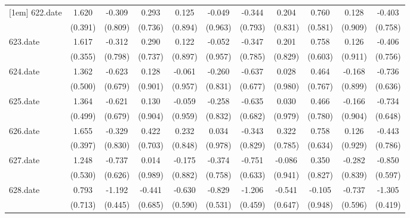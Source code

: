 \begin{tabular}{l*{10}{c}}
[1em]
622.date    &       1.620&      -0.309&       0.293&       0.125&      -0.049&      -0.344&       0.204&       0.760&       0.128&      -0.403\\
            &     (0.391)&     (0.809)&     (0.736)&     (0.894)&     (0.963)&     (0.793)&     (0.831)&     (0.581)&     (0.909)&     (0.758)\\
[1em]
623.date    &       1.617&      -0.312&       0.290&       0.122&      -0.052&      -0.347&       0.201&       0.758&       0.126&      -0.406\\
            &     (0.355)&     (0.798)&     (0.737)&     (0.897)&     (0.957)&     (0.785)&     (0.829)&     (0.603)&     (0.911)&     (0.756)\\
[1em]
624.date    &       1.362&      -0.623&       0.128&      -0.061&      -0.260&      -0.637&       0.028&       0.464&      -0.168&      -0.736\\
            &     (0.500)&     (0.679)&     (0.901)&     (0.957)&     (0.831)&     (0.677)&     (0.980)&     (0.767)&     (0.899)&     (0.636)\\
[1em]
625.date    &       1.364&      -0.621&       0.130&      -0.059&      -0.258&      -0.635&       0.030&       0.466&      -0.166&      -0.734\\
            &     (0.499)&     (0.679)&     (0.904)&     (0.959)&     (0.832)&     (0.682)&     (0.979)&     (0.780)&     (0.904)&     (0.648)\\
[1em]
626.date    &       1.655&      -0.329&       0.422&       0.232&       0.034&      -0.343&       0.322&       0.758&       0.126&      -0.443\\
            &     (0.397)&     (0.830)&     (0.703)&     (0.848)&     (0.978)&     (0.829)&     (0.785)&     (0.634)&     (0.929)&     (0.786)\\
[1em]
627.date    &       1.248&      -0.737&       0.014&      -0.175&      -0.374&      -0.751&      -0.086&       0.350&      -0.282&      -0.850\\
            &     (0.530)&     (0.626)&     (0.989)&     (0.882)&     (0.758)&     (0.633)&     (0.941)&     (0.827)&     (0.839)&     (0.597)\\
[1em]
628.date    &       0.793&      -1.192&      -0.441&      -0.630&      -0.829&      -1.206&      -0.541&      -0.105&      -0.737&      -1.305\\
            &     (0.713)&     (0.445)&     (0.685)&     (0.590)&     (0.531)&     (0.459)&     (0.647)&     (0.948)&     (0.596)&     (0.419)\\

\end{tabular}
